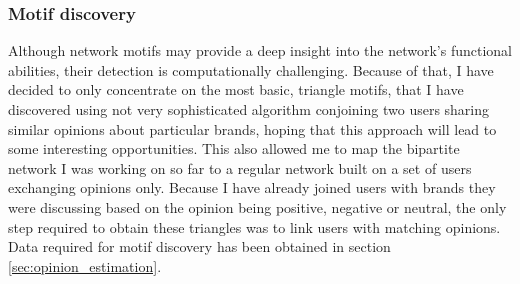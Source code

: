     \subsubsection{Motif discovery}
    
      Although network motifs may provide a deep insight into the network's functional abilities, their detection is computationally challenging. Because of that, I have decided to only concentrate on the most basic, triangle motifs, that I have discovered using not very sophisticated algorithm conjoining two users sharing similar opinions about particular brands, hoping that this approach will lead to some interesting opportunities. This also allowed me to map the bipartite network I was working on so far to a regular network built on a set of users exchanging opinions only. Because I have already joined users with brands they were discussing based on the opinion being positive, negative or neutral, the only step required to obtain these triangles was to link users with matching opinions. Data required for motif discovery has been obtained in section \ref{sec:opinion_estimation}.
      
